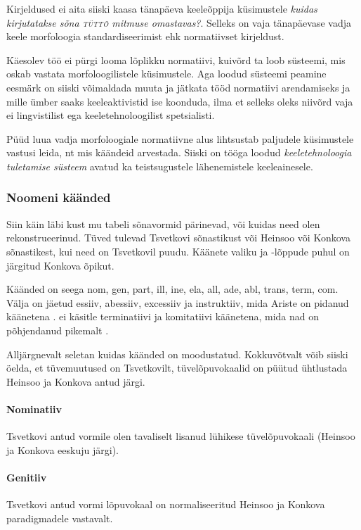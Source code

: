 \documentclass[12pt,a4paper]{article}
\begin{document}
Kirjeldused ei aita siiski kaasa tänapäeva keeleõppija küsimustele \textit{kuidas kirjutatakse sõna \textsc{tüttö} mitmuse omastavas?}. Selleks on vaja tänapäevase vadja keele morfoloogia standardiseerimist ehk normatiivset kirjeldust.

Käesolev töö ei pürgi looma lõplikku normatiivi, kuivõrd ta loob süsteemi, mis oskab vastata morfoloogilistele küsimustele. Aga loodud süsteemi peamine eesmärk on siiski võimaldada muuta ja jätkata tööd normatiivi arendamiseks ja mille ümber saaks keeleaktivistid ise koonduda, ilma et selleks oleks niivõrd vaja ei lingvistilist ega keeletehnoloogilist spetsialisti.

Püüd luua vadja morfoloogiale normatiivne alus lihtsustab paljudele küsimustele vastusi leida, nt mis käändeid arvestada. Siiski on tööga loodud \textit{keele\-tehnoloogia tuletamise süsteem} avatud ka teistsugustele lähenemistele keeleainesele.

\subsubsection{Noomeni käänded}

Siin käin läbi kust mu tabeli sõnavormid pärinevad, või kuidas need olen rekonstrueerinud. Tüved tulevad Tsvetkovi sõnastikust või Heinsoo või Konkova sõnastikest, kui need on Tsvetkovil puudu. Käänete valiku ja -lõppude puhul on järgitud Konkova õpikut.

Käänded on seega nom, gen, part, ill, ine, ela, all, ade, abl, trans, term, com.
Välja on jäetud essiiv, abessiiv, excessiiv ja instruktiiv, mida Ariste on pidanud käänetena \cite[17]{ariste_grammar_1968}. \cite{__2011} ei käsitle terminatiivi ja komitatiivi käänetena, mida nad on põhjendanud pikemalt \cite{markus_comitative_2014}.

Alljärgnevalt seletan kuidas käänded on moodustatud. Kokkuvõtvalt võib siiski öelda, et tüvemuutused on Tsvetkovilt, tüvelõpuvokaalid on püütud ühtlustada Heinsoo ja Konkova antud järgi.

\paragraph*{Nominatiiv}
Tsvetkovi antud vormile olen tavaliselt lisanud lühikese tüvelõpuvokaali (Heinsoo ja Konkova eeskuju järgi).

\paragraph*{Genitiiv}
Tsvetkovi antud vormi lõpuvokaal on normaliseeritud Heinsoo ja Konkova paradigmadele vastavalt.
\end{document}
